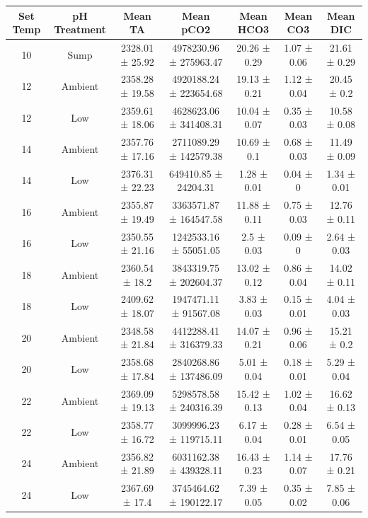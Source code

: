 \documentclass[
  12pt,
]{article}
\begin{document}
\begin{table}[!ht]
    \centering
    \begin{tabular}{|c|c|c|c|c|c|c|}
    \hline
        \textbf{Set Temp} & \textbf{pH Treatment} & \textbf{Mean TA} & \textbf{Mean pCO2} & \textbf{Mean HCO3} & \textbf{Mean CO3} & \textbf{Mean DIC} \\ \hline
        10 & Sump & 2328.01 ± 25.92 & 4978230.96 ± 275963.47 & 20.26 ± 0.29 & 1.07 ± 0.06 & 21.61 ± 0.29 \\ \hline
        12 & Ambient & 2358.28 ± 19.58 & 4920188.24 ± 223654.68 & 19.13 ± 0.21 & 1.12 ± 0.04 & 20.45 ± 0.2 \\ \hline
        12 & Low & 2359.61 ± 18.06 & 4628623.06 ± 341408.31 & 10.04 ± 0.07 & 0.35 ± 0.03 & 10.58 ± 0.08 \\ \hline
        14 & Ambient & 2357.76 ± 17.16 & 2711089.29 ± 142579.38 & 10.69 ± 0.1 & 0.68 ± 0.03 & 11.49 ± 0.09 \\ \hline
        14 & Low & 2376.31 ± 22.23 & 649410.85 ± 24204.31 & 1.28 ± 0.01 & 0.04 ± 0 & 1.34 ± 0.01 \\ \hline
        16 & Ambient & 2355.87 ± 19.49 & 3363571.87 ± 164547.58 & 11.88 ± 0.11 & 0.75 ± 0.03 & 12.76 ± 0.11 \\ \hline
        16 & Low & 2350.55 ± 21.16 & 1242533.16 ± 55051.05 & 2.5 ± 0.03 & 0.09 ± 0 & 2.64 ± 0.03 \\ \hline
        18 & Ambient & 2360.54 ± 18.2 & 3843319.75 ± 202604.37 & 13.02 ± 0.12 & 0.86 ± 0.04 & 14.02 ± 0.11 \\ \hline
        18 & Low & 2409.62 ± 18.07 & 1947471.11 ± 91567.08 & 3.83 ± 0.03 & 0.15 ± 0.01 & 4.04 ± 0.03 \\ \hline
        20 & Ambient & 2348.58 ± 21.84 & 4412288.41 ± 316379.33 & 14.07 ± 0.21 & 0.96 ± 0.06 & 15.21 ± 0.2 \\ \hline
        20 & Low & 2358.68 ± 17.84 & 2840268.86 ± 137486.09 & 5.01 ± 0.04 & 0.18 ± 0.01 & 5.29 ± 0.04 \\ \hline
        22 & Ambient & 2369.09 ± 19.13 & 5298578.58 ± 240316.39 & 15.42 ± 0.13 & 1.02 ± 0.04 & 16.62 ± 0.13 \\ \hline
        22 & Low & 2358.77 ± 16.72 & 3099996.23 ± 119715.11 & 6.17 ± 0.04 & 0.28 ± 0.01 & 6.54 ± 0.05 \\ \hline
        24 & Ambient & 2356.82 ± 21.89 & 6031162.38 ± 439328.11 & 16.43 ± 0.23 & 1.14 ± 0.07 & 17.76 ± 0.21 \\ \hline
        24 & Low & 2367.69 ± 17.4 & 3745464.62 ± 190122.17 & 7.39 ± 0.05 & 0.35 ± 0.02 & 7.85 ± 0.06 \\ \hline

\end{tabular}
\end{table}
\end{document}
